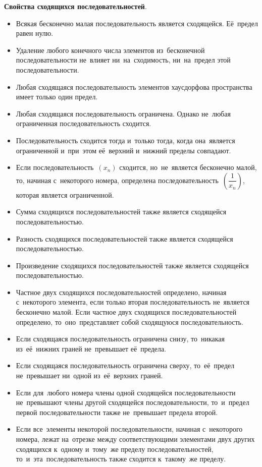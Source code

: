 \documentclass[]{scrartcl}
\begin{document}
\textbf{Свойства сходящихся последовательностей}.
\begin{itemize}
	\item Всякая бесконечно малая последовательность является сходящейся. Её~предел равен нулю.
	\item Удаление любого конечного числа элементов из~бесконечной последовательности не~влияет ни~на~сходимость, ни~на~предел этой последовательности.
	\item Любая сходящаяся последовательность элементов хаусдорфова пространства имеет только один предел.
	\item Любая сходящаяся последовательность ограничена. Однако не~любая ограниченная последовательность сходится.
	\item Последовательность сходится тогда и~только тогда, когда она~является ограниченной и~при~этом её~верхний и~нижний пределы совпадают.
	\item Если последовательность~${\textstyle (x_{n})}$ сходится, но~не~является бесконечно малой, то, начиная с~некоторого номера, определена последовательность~${\textstyle (\dfrac{1}{x_n})}$, которая является ограниченной.
	\item Сумма сходящихся последовательностей также является сходящейся последовательностью.
	\item Разность сходящихся последовательностей также является сходящейся последовательностью.
	\item Произведение сходящихся последовательностей также является сходящейся последовательностью.
	\item Частное двух сходящихся последовательностей определено, начиная с~некоторого элемента, если только вторая последовательность не~является бесконечно малой. Если частное двух сходящихся последовательностей определено, то~оно~представляет собой сходящуюся последовательность.
	\item Если сходящаяся последовательность ограничена снизу, то~никакая из~её~нижних граней не~превышает её~предела.
	\item Если сходящаяся последовательность ограничена сверху, то~её~предел не~превышает ни~одной из~её~верхних граней.
	\item Если для~любого номера члены одной сходящейся последовательности не~превышают члены другой сходящейся последовательности, то~и~предел первой последовательности также не~превышает предела второй.
	\item Если все~элементы некоторой последовательности, начиная с~некоторого номера, лежат на~отрезке между соответствующими элементами двух других сходящихся к~одному и~тому~же пределу последовательностей, то~и~эта~последовательность также сходится к~такому~же пределу.

\end{itemize}
\end{document}
